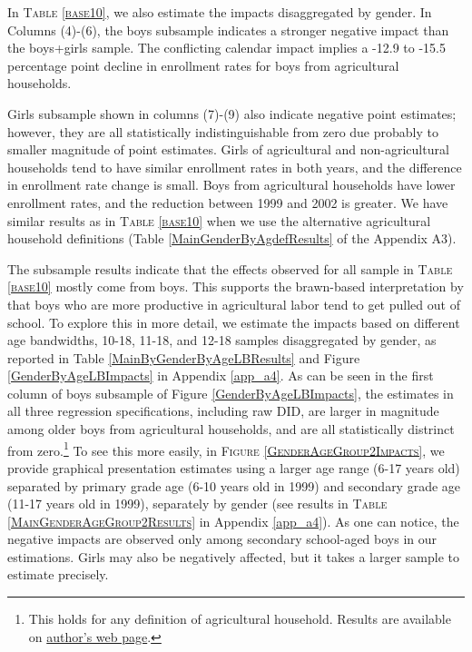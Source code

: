 \documentclass[12pt,letterpaper]{article}
\newcommand{\0}{\ensuremath{\mbox{\boldmath $0$}}}
\begin{document}
In \textsc{\small Table \ref{base10}}, we also estimate the impacts disaggregated by gender. In Columns (4)-(6), the boys subsample indicates a stronger negative impact than the boys+girls sample. The conflicting calendar impact implies a -12.9 to -15.5 percentage point decline in enrollment rates for boys from agricultural households. 

Girls subsample shown in columns (7)-(9) also indicate negative point estimates; however, they are all statistically indistinguishable from zero due probably to smaller magnitude of point estimates. Girls of agricultural and non-agricultural households tend to have similar enrollment rates in both years, and the difference in enrollment rate change is small. Boys from agricultural households have lower enrollment rates, and the reduction between 1999 and 2002 is greater. We have similar results as in \textsc{\small Table \ref{base10}} when we use the alternative agricultural household definitions (\textsf{\small Table \ref{MainGenderByAgdefResults}} of the Appendix A3). 

The subsample results indicate that the effects observed for all sample in \textsc{\small Table \ref{base10}} mostly come from boys. This supports the brawn-based interpretation by \cite{PittRosenzweigHassan2010} that boys who are more productive in agricultural labor tend to get pulled out of school. To explore this in more detail, we estimate the impacts based on different age bandwidths, 10-18, 11-18, and 12-18 samples disaggregated by gender, as reported in \textsf{\small Table \ref{MainByGenderByAgeLBResults}} and \textsf{\small Figure \ref{GenderByAgeLBImpacts}} in Appendix \ref{app_a4}. As can be seen in the first column of boys subsample of \textsf{\small Figure \ref{GenderByAgeLBImpacts}}, the estimates in all three regression specifications, including raw DID, are larger in magnitude among older boys from agricultural households, and are all statistically distrinct from zero.\footnote{This holds for any definition of agricultural household. Results are available on \href{https://seiroito.github.io/Ramadan/program/RamadanEstimationJDE_Tufte.html#by-different-age-cutoff}{author's web page}. } To see this more easily, in \textsc{\small Figure \ref{GenderAgeGroup2Impacts}}, we provide graphical presentation estimates using a larger age range (6-17 years old) separated by primary grade age (6-10 years old in 1999) and secondary grade age (11-17 years old in 1999), separately by gender (see results in \textsc{\small Table \ref{MainGenderAgeGroup2Results}} in Appendix \ref{app_a4}). As one can notice, the negative impacts are observed only among secondary school-aged boys in our estimations. Girls may also be negatively affected, but it takes a larger sample to estimate precisely.
\end{document}
